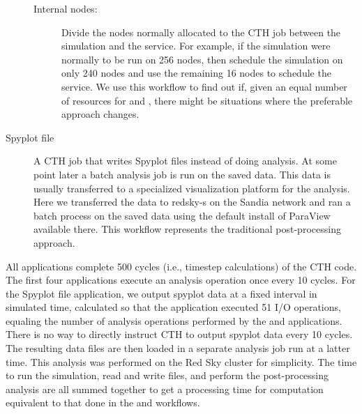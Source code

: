 \begin{description}
\begin{description}
  \item[Internal nodes:] Divide the nodes normally allocated to the CTH job
    between the simulation and the \vda service.  For example, if the
    simulation were normally to be run on 256 nodes, then schedule the
    simulation on only 240 nodes and use the remaining 16 nodes to schedule
    the \vda service.  We use this workflow to find out if, given an equal
    number of resources for \insitu and \intransit, there might be
    situations where the preferable approach changes.
    
  \end{description}

\item [Spyplot file] A CTH job that writes Spyplot files instead of doing
  analysis.  At some point later a batch analysis job is run on the saved
  data.  This data is usually transferred to a specialized visualization
  platform for the analysis.  Here we transferred the data to redsky-s on
  the Sandia network and ran a batch process on the saved data using the
  default install of ParaView available there. This workflow represents the
  traditional post-processing approach.
\end{description}

All applications complete 500 cycles (i.e., timestep calculations) of the
CTH code. The first four applications execute an analysis operation once
every 10 cycles.  For the Spyplot file application, we output spyplot data
at a fixed interval in simulated time, calculated so that the application
executed 51 I/O operations, equaling the number of analysis operations
performed by the \insitu and \intransit applications.  There is no way to
directly instruct CTH to output spyplot data every 10 cycles.  The
resulting data files are then loaded in a separate analysis job run at a
latter time.  This analysis was performed on the Red Sky cluster for
simplicity.    The time to run the simulation, read
and write files, and perform the post-processing analysis are all summed
together to get a processing time for computation equivalent to that done
in the \insitu and \intransit workflows.

